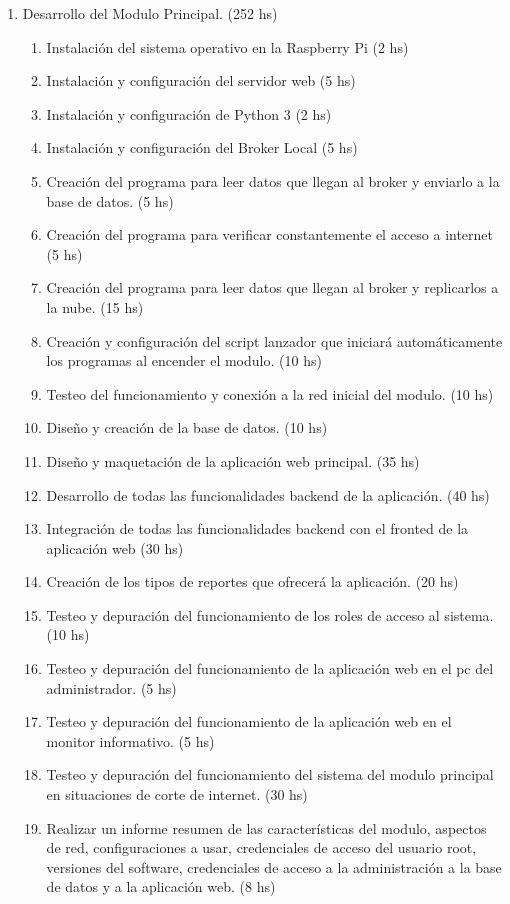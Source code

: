 \documentclass[11pt]{charter}
\begin{document}
\begin{enumerate}
\begin{enumerate}
	\end{enumerate}
\item Desarrollo del Modulo Principal. (252 hs)
	\begin{enumerate}
	\item Instalación del sistema operativo en la Raspberry Pi (2 hs)
	\item Instalación y configuración del servidor web (5 hs)
	\item Instalación y configuración de Python 3 (2 hs)
	\item Instalación y configuración del Broker Local (5 hs)
	\item Creación del programa para leer datos que llegan al broker y enviarlo a la base de datos. (5 hs)
	\item Creación del programa para verificar constantemente el acceso a internet (5 hs)
	\item Creación del programa para leer datos que llegan al broker y replicarlos a la nube. (15 hs)
	\item Creación y configuración del script lanzador que iniciará automáticamente los programas al encender el modulo. (10 hs)
	\item Testeo del funcionamiento y conexión a la red inicial del modulo. (10 hs)
	\item Diseño y creación de la base de datos. (10 hs)
	\item Diseño y maquetación de la aplicación web principal. (35 hs)
	\item Desarrollo de todas las funcionalidades backend de la aplicación. (40 hs)
	\item Integración de todas las funcionalidades backend con el fronted de la aplicación web (30 hs)
	\item Creación de los tipos de reportes que ofrecerá la aplicación. (20 hs)
	\item Testeo y depuración del funcionamiento de los roles de acceso al sistema. (10 hs)
	\item Testeo y depuración del funcionamiento de la aplicación web en el pc del administrador. (5 hs)
	\item Testeo y depuración del funcionamiento de la aplicación web en el monitor informativo. (5 hs)
	\item Testeo y depuración del funcionamiento del sistema del modulo principal en situaciones de corte de internet. (30 hs) 
	\item Realizar un informe resumen de las características del modulo, aspectos de red, configuraciones a usar, credenciales de acceso del usuario root, versiones del software, credenciales de acceso a la administración a la base de datos y a la aplicación web. (8 hs)

\end{enumerate}
\end{enumerate}
\end{document}
